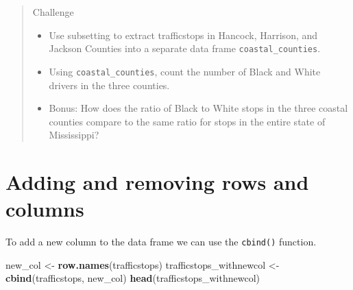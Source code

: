 \documentclass[]{book}
\newenvironment{Shaded}{\begin{snugshade}}{\end{snugshade}}
\newcommand{\KeywordTok}[1]{\textcolor[rgb]{0.13,0.29,0.53}{\textbf{#1}}}
\newcommand{\StringTok}[1]{\textcolor[rgb]{0.31,0.60,0.02}{#1}}
\newcommand{\NormalTok}[1]{#1}
\providecommand{\tightlist}{%
  \setlength{\itemsep}{0pt}\setlength{\parskip}{0pt}}
\begin{document}
\begin{quote}
Challenge

\begin{itemize}
\tightlist
\item
  Use subsetting to extract trafficstops in Hancock, Harrison, and
  Jackson Counties into a separate data frame
  \texttt{coastal\_counties}.
\item
  Using \texttt{coastal\_counties}, count the number of Black and White
  drivers in the three counties.
\item
  Bonus: How does the ratio of Black to White stops in the three coastal
  counties compare to the same ratio for stops in the entire state of
  Mississippi?
\end{itemize}
\end{quote}

\section{Adding and removing rows and
columns}\label{adding-and-removing-rows-and-columns}

To add a new column to the data frame we can use the \texttt{cbind()}
function.

\begin{Shaded}
\begin{Highlighting}[]
\NormalTok{new_col <-}\StringTok{ }\KeywordTok{row.names}\NormalTok{(trafficstops)}
\NormalTok{trafficstops_withnewcol <-}\StringTok{ }\KeywordTok{cbind}\NormalTok{(trafficstops, new_col)}
\KeywordTok{head}\NormalTok{(trafficstops_withnewcol)}
\end{Highlighting}
\end{Shaded}
\end{document}
